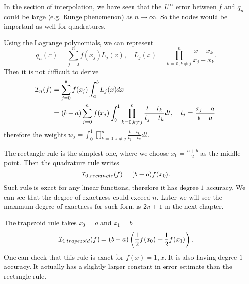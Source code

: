 \begin{remark}
    In the section of interpolation, we have seen that the $L^{\infty}$ error between $f$ and $q_n$ could be large (e.g. Runge phenomenon) as $n\to \infty$. So the nodes would be important as well for quadratures.
\end{remark}
Using the Lagrange polynomials, we can represent 
\begin{equation}
    q_n(x) = \sum_{j=0}^n f(x_j) L_j(x),\quad L_j(x) = \prod_{k=0, k\neq j}^n \frac{x - x_k}{x_j - x_k}. 
\end{equation}
Then it is not difficult to derive
\begin{equation}
    \begin{aligned}
        \mathcal I_n(f)& = \sum_{j=0}^n f(x_j) \int_a^b L_j(x) dx  \\ &=(b-a) \sum_{j=0}^n f(x_j) \int_0^1 \prod_{k=0, k\neq j }^n \frac{t - t_k}{t_j - t_k} dt, \quad t_j = \frac{x_j - a}{b-a}.   
    \end{aligned}
\end{equation}
therefore the weights $w_j =  \int_0^1 \prod_{k=0, k\neq j }^n \frac{t - t_k}{t_j - t_k} dt$. 

\begin{example}
   The rectangle rule is the simplest one, where we choose $x_0 = \frac{a+b}{2}$ as the middle point. Then the quadrature rule writes
   $$\mathcal I_{0, rectangle}(f)  = (b-a) f(x_0). $$
  Such rule is exact for any linear functions, therefore it has degree $1$ accuracy. We can see that the degree of exactness could exceed $n$. Later we will see the maximum degree of exactness for such form is $2n+1$ in the next chapter.
\end{example}

\begin{example}
The trapezoid rule takes $x_0 = a$ and $x_1= b$. 
$$\mathcal I_{1,trapezoid} (f) = (b-a)\left( \frac{1}{2} f(x_0) + \frac{1}{2} f(x_1) \right).$$
One can check that this rule is exact for $f(x) = 1, x$. It is also having degree $1$ accuracy. It actually has a slightly larger constant in error estimate than the rectangle rule.
\end{example}
